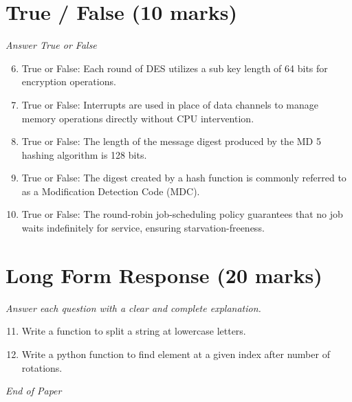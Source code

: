 \documentclass[12pt]{article}
\begin{document}
\section*{True / False (10 marks)}
\textit{Answer True or False}
\begin{enumerate}[label=\arabic*.]
\setcounter{enumi}{5}
\item True or False: Each round of DES utilizes a sub key length of 64 bits for encryption operations.
\item True or False: Interrupts are used in place of data channels to manage memory operations directly without CPU intervention.
\item True or False: The length of the message digest produced by the MD 5 hashing algorithm is 128 bits.
\item True or False: The digest created by a hash function is commonly referred to as a Modification Detection Code (MDC).
\item True or False: The round-robin job-scheduling policy guarantees that no job waits indefinitely for service, ensuring starvation-freeness.
\end{enumerate}

\section*{Long Form Response (20 marks)}
\textit{Answer each question with a clear and complete explanation.}
\begin{enumerate}[label=\arabic*.]
\setcounter{enumi}{10}
\item Write a function to split a string at lowercase letters.
\item Write a python function to find element at a given index after number of rotations.
\end{enumerate}

\vfill
\noindent\textit{End of Paper}
\end{document}
